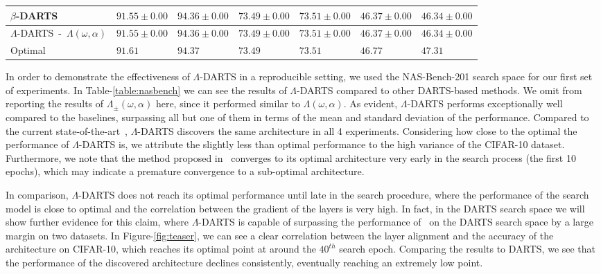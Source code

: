 \documentclass{article} \usepackage{fancyhdr, iclr2023_conference, times}
\newcommand{\mydarts}{$\Lambda$-DARTS\xspace}
\newcommand{\lambdafn}{layer alignment\xspace}
\begin{document}
\begin{table}[t]
\begin{center}
{\begin{tabular}{l l l l l l l}
$\beta$-DARTS~\citep{DBLP:journals/corr/abs-2203-01665} & $\mathbf{91.55\pm 0.00}$ & $\mathbf{94.36\pm 0.00}$ & $\mathbf{73.49\pm0.00}$ & $\mathbf{73.51\pm0.00}$ & $\mathbf{46.37\pm0.00}$ & $\mathbf{46.34\pm 0.00}$\\
\hline
\mydarts~-~$\Lambda(\omega, \alpha)$ & $\mathbf{91.55\pm 0.00}$ & $\mathbf{94.36\pm 0.00}$ & $\mathbf{73.49\pm0.00}$ & $\mathbf{73.51\pm0.00}$ & $\mathbf{46.37\pm0.00}$ & $\mathbf{46.34\pm 0.00}$\\
\hline
Optimal~\citep{DBLP:conf/iclr/Dong020} & $91.61$ & $94.37$ & $73.49$ & $73.51$ & $46.77$ & $47.31$
\end{tabular}
}
\end{center}
\vspace{-10pt}
\end{table}
\par In order to demonstrate the effectiveness of \mydarts in a reproducible setting, we used the NAS-Bench-201 search space for our first set of experiments. In Table-\ref{table:nasbench} we can see the results of \mydarts compared to other DARTS-based methods. We omit from reporting the results of $\Lambda_\pm(\omega, \alpha)$ here, since it performed similar to $\Lambda(\omega, \alpha)$. As evident, \mydarts performs exceptionally well compared to the baselines, surpassing all but one of them in terms of the mean and standard deviation of the performance. Compared to the current state-of-the-art~\citep{DBLP:journals/corr/abs-2203-01665}, \mydarts discovers the same architecture in all 4 experiments. Considering how close to the optimal the performance of \mydarts is, we attribute the slightly less than optimal performance to the high variance of the CIFAR-10 dataset. Furthermore, we note that the method proposed in~\citep{DBLP:journals/corr/abs-2203-01665} converges to its optimal architecture very early in the search process (the first 10 epochs), which may indicate a premature convergence to a sub-optimal architecture. 
\par In comparison, \mydarts does not reach its optimal performance until late in the search procedure, where the performance of the search model is close to optimal and the correlation between the gradient of the layers is very high. In fact, in the DARTS search space we will show further evidence for this claim, where \mydarts is capable of surpassing the performance of~\citep{DBLP:journals/corr/abs-2203-01665} on the DARTS search space by a large margin on two datasets. In Figure-\ref{fig:teaser}, we can see a clear correlation between the \lambdafn and the accuracy of the architecture on CIFAR-10, which reaches its optimal point at around the $40^{th}$ search epoch. Comparing the results to DARTS, we see that the performance of the discovered architecture declines consistently, eventually reaching an extremely low point. 
\end{document}
